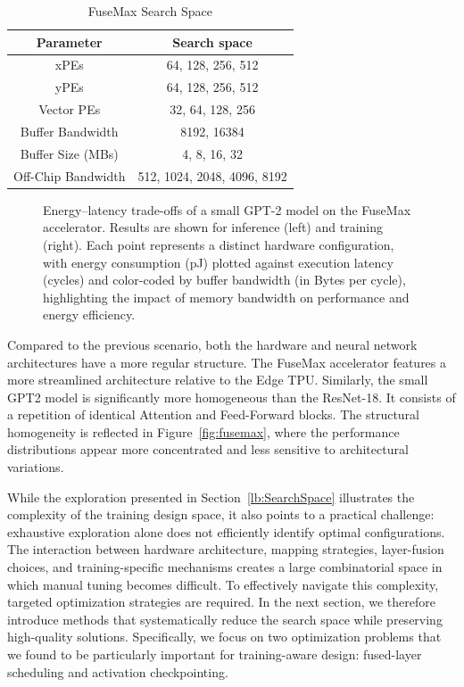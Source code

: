 \documentclass[lettersize,journal]{IEEEtran}
\begin{document}
\begin{table}[b!]
    \centering
    \caption{FuseMax Search Space}
    \begin{tabular}{c c}
         Parameter&  Search space\\ \hline
         xPEs & 64, 128, 256, 512 \\ \hline
         yPEs & 64, 128, 256, 512 \\ \hline
         Vector PEs & 32, 64, 128, 256\\ \hline
         Buffer Bandwidth & 8192, 16384\\ \hline
         Buffer Size (MBs) & 4, 8, 16, 32 \\ \hline
         Off-Chip Bandwidth & 512, 1024, 2048, 4096, 8192\\ \hline
    \end{tabular}
    \vspace{0.2cm}
    
    \label{tab:fusemaxsearchspace}
\end{table}

\begin{figure}[t!]
\begin{center}

\end{center}
\caption{Energy–latency trade-offs of a small GPT-2 model on the FuseMax accelerator. Results are shown for inference (left) and training (right). Each point represents a distinct hardware configuration, with energy consumption (pJ) plotted against execution latency (cycles) and color-coded by buffer bandwidth (in Bytes per cycle), highlighting the impact of memory bandwidth on performance and energy efficiency.}
\label{fig:GPTHWExplo}
\end{figure}

Compared to the previous scenario, both the hardware and neural network architectures have a more regular structure. The FuseMax accelerator features a more streamlined architecture relative to the Edge TPU. Similarly,  the small GPT2 model is significantly more homogeneous than the ResNet-18. It consists of a repetition of identical Attention and Feed-Forward blocks. The structural homogeneity is reflected in Figure~\ref{fig:fusemax}, where the performance distributions appear more concentrated and less sensitive to architectural variations.

While the exploration presented in Section~\ref{lb:SearchSpace} illustrates the complexity of the training design space, it also points to a practical challenge: exhaustive exploration alone does not efficiently identify optimal configurations. The interaction between hardware architecture, mapping strategies, layer-fusion choices, and training-specific mechanisms creates a large combinatorial space in which manual tuning becomes difficult.
To effectively navigate this complexity, targeted optimization strategies are required. In the next section, we therefore introduce methods that systematically reduce the search space while preserving high-quality solutions. Specifically, we focus on two optimization problems that we found to be particularly important for training-aware design: fused-layer scheduling and activation checkpointing.
\end{document}
